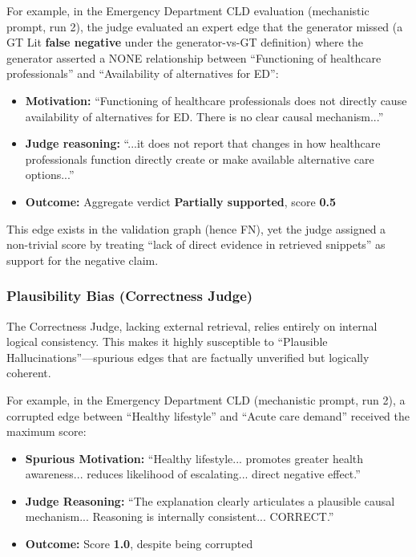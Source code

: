 For example, in the Emergency Department CLD evaluation (mechanistic prompt, run 2), the judge evaluated an expert edge that the generator missed (a GT Lit \textbf{false negative} under the generator-vs-GT definition) where the generator asserted a NONE relationship between ``Functioning of healthcare professionals'' and ``Availability of alternatives for ED'':
\begin{itemize}[noitemsep]
    \item \textbf{Motivation:} ``Functioning of healthcare professionals does not directly cause availability of alternatives for ED. There is no clear causal mechanism...''
    \item \textbf{Judge reasoning:} ``...it does not report that changes in how healthcare professionals function directly create or make available alternative care options...''
    \item \textbf{Outcome:} Aggregate verdict \textbf{Partially supported}, score \textbf{0.5}
\end{itemize}

This edge exists in the validation graph (hence FN), yet the judge assigned a non-trivial score by treating ``lack of direct evidence in retrieved snippets'' as support for the negative claim.

\subsubsection{Plausibility Bias (Correctness Judge)}

The Correctness Judge, lacking external retrieval, relies entirely on internal logical consistency. This makes it highly susceptible to ``Plausible Hallucinations''---spurious edges that are factually unverified but logically coherent.

For example, in the Emergency Department CLD (mechanistic prompt, run 2), a corrupted edge between ``Healthy lifestyle'' and ``Acute care demand'' received the maximum score:
\begin{itemize}[noitemsep]
    \item \textbf{Spurious Motivation:} ``Healthy lifestyle... promotes greater health awareness... reduces likelihood of escalating... direct negative effect.''
    \item \textbf{Judge Reasoning:} ``The explanation clearly articulates a plausible causal mechanism... Reasoning is internally consistent... CORRECT.''
    \item \textbf{Outcome:} Score \textbf{1.0}, despite being corrupted
\end{itemize}

